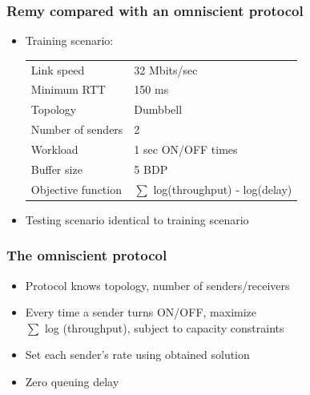 \begin{frame}
\frametitle{Remy compared with an omniscient protocol}
\begin{itemize}
\item Training scenario:
\begin{tabular}{ll}
Link speed & 32 Mbits/sec \\
Minimum RTT & 150 ms \\
Topology & Dumbbell \\
Number of senders & 2 \\
Workload & 1 sec ON/OFF times \\
Buffer size & 5 BDP \\
Objective function & $\sum$ log(throughput) - log(delay)
\end{tabular}
\item Testing scenario identical to training scenario
\end{itemize}
\end{frame}

\begin{frame}
\frametitle{The omniscient protocol}
\begin{itemize}
\item Protocol knows topology, number of senders/receivers  
\item Every time a sender turns ON/OFF, maximize \\ $\sum$ log (throughput), subject to capacity constraints
\item Set each sender's rate using obtained solution
\item Zero queuing delay
\end{itemize}
\end{frame}

